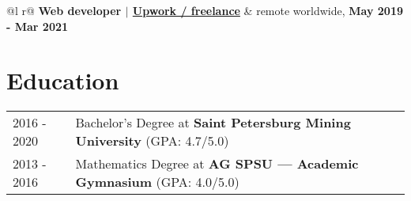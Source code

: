 \documentclass[a4paper,12pt]{article}
\begin{document}
\begin{tabularx}{\linewidth}{ @{}l r@{} }
\textbf{Web developer $|$ \underline{Upwork / freelance}} & \hfill remote worldwide, \textbf{May 2019 - Mar 2021}\\[3.75pt]
\end{tabularx}

\section{Education}
\begin{tabularx}{\linewidth}{@{}l X@{}}
2016 - 2020 & Bachelor's Degree at \textbf{Saint Petersburg Mining University} \hfill \normalsize (GPA: 4.7/5.0) \\
2013 - 2016 & Mathematics Degree at \textbf{AG SPSU — Academic Gymnasium} \hfill (GPA: 4.0/5.0) \\
\end{tabularx}

\vfill
{}
\end{document}
